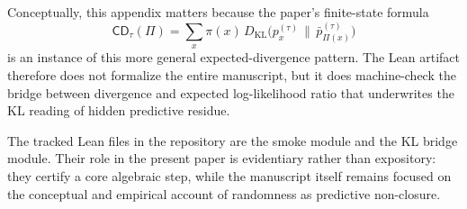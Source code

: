 \documentclass[11pt]{article}
\numberwithin{equation}{section}
\begin{document}
Conceptually, this appendix matters because the paper's finite-state formula
\[
\mathsf{CD}_\tau(\Pi)
=
\sum_x \pi(x)\,
D_{\mathrm{KL}}\!\bigl(p_x^{(\tau)} \,\|\, \bar p_{\Pi(x)}^{(\tau)}\bigr)
\]
is an instance of this more general expected-divergence pattern. The Lean artifact therefore does not formalize the entire manuscript, but it does machine-check the bridge between divergence and expected log-likelihood ratio that underwrites the KL reading of hidden predictive residue.

The tracked Lean files in the repository are the smoke module and the KL bridge module. Their role in the present paper is evidentiary rather than expository: they certify a core algebraic step, while the manuscript itself remains focused on the conceptual and empirical account of randomness as predictive non-closure.
 


\end{document}
